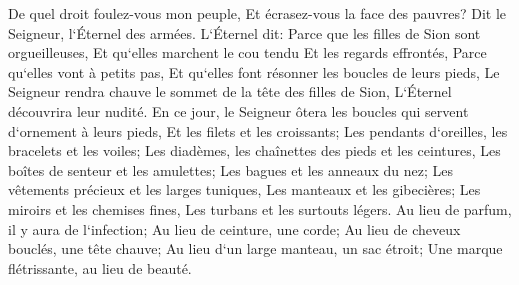\verse De quel droit foulez-vous mon peuple, Et écrasez-vous la face des pauvres? Dit le Seigneur, l`Éternel des armées. 
\verse L`Éternel dit: Parce que les filles de Sion sont orgueilleuses, Et qu`elles marchent le cou tendu Et les regards effrontés, Parce qu`elles vont à petits pas, Et qu`elles font résonner les boucles de leurs pieds, 
\verse Le Seigneur rendra chauve le sommet de la tête des filles de Sion, L`Éternel découvrira leur nudité. 
\verse En ce jour, le Seigneur ôtera les boucles qui servent d`ornement à leurs pieds, Et les filets et les croissants; 
\verse Les pendants d`oreilles, les bracelets et les voiles; 
\verse Les diadèmes, les chaînettes des pieds et les ceintures, Les boîtes de senteur et les amulettes; 
\verse Les bagues et les anneaux du nez; 
\verse Les vêtements précieux et les larges tuniques, Les manteaux et les gibecières; 
\verse Les miroirs et les chemises fines, Les turbans et les surtouts légers. 
\verse Au lieu de parfum, il y aura de l`infection; Au lieu de ceinture, une corde; Au lieu de cheveux bouclés, une tête chauve; Au lieu d`un large manteau, un sac étroit; Une marque flétrissante, au lieu de beauté. 
